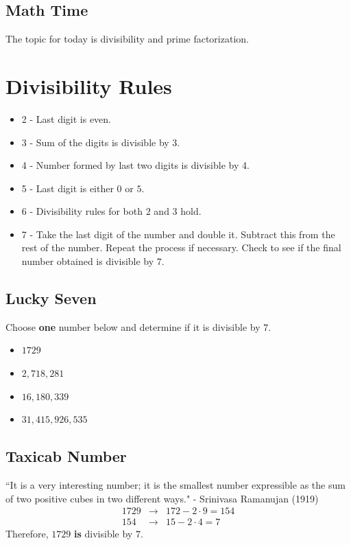 \clearpage  

\subsection{Math Time}

The topic for today is divisibility and prime factorization.  %

\clearpage

\section{Divisibility Rules}

\begin{itemize}
\item  2 - Last digit is even.
\item  3 - Sum of the digits is divisible by 3.
\item 4  - Number formed by last two digits is divisible by 4.
\item 5 - Last digit is either $0$ or $5$.
\item 6 -  Divisibility rules for both $2$ and $3$ hold.
\item 7  - Take the last digit of the number and double it.  Subtract this from the rest of the number.  Repeat the process if necessary.  Check to see if the final number obtained is divisible by $7$.
\end{itemize}




\clearpage

\subsection*{Lucky Seven}

Choose \textbf{one} number below and determine if it is divisible by $7$.
\begin{itemize}
	\item $1729$
	\item $2,718,281$
	\item $16,180,339$
	\item $31,415,926,535$
\end{itemize}

\subsection*{Taxicab Number}

``It is a very interesting number; it is the smallest number expressible as the sum of two positive cubes in two different ways." -  Srinivasa Ramanujan (1919)
\begin{eqnarray*}
	1729 &\to& 172-2\cdot 9=154 \\ 
	154 &\to& 15-2\cdot 4=7
\end{eqnarray*}
Therefore, $1729$ \textbf{is} divisible by $7$.


